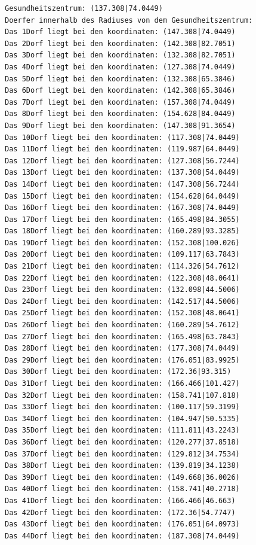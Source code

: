 \documentclass{article}
\begin{document}
\begin{verbatim}
Gesundheitszentrum: (137.308|74.0449)
Doerfer innerhalb des Radiuses von dem Gesundheitszentrum: 
Das 1Dorf liegt bei den koordinaten: (147.308|74.0449)
Das 2Dorf liegt bei den koordinaten: (142.308|82.7051)
Das 3Dorf liegt bei den koordinaten: (132.308|82.7051)
Das 4Dorf liegt bei den koordinaten: (127.308|74.0449)
Das 5Dorf liegt bei den koordinaten: (132.308|65.3846)
Das 6Dorf liegt bei den koordinaten: (142.308|65.3846)
Das 7Dorf liegt bei den koordinaten: (157.308|74.0449)
Das 8Dorf liegt bei den koordinaten: (154.628|84.0449)
Das 9Dorf liegt bei den koordinaten: (147.308|91.3654)
Das 10Dorf liegt bei den koordinaten: (117.308|74.0449)
Das 11Dorf liegt bei den koordinaten: (119.987|64.0449)
Das 12Dorf liegt bei den koordinaten: (127.308|56.7244)
Das 13Dorf liegt bei den koordinaten: (137.308|54.0449)
Das 14Dorf liegt bei den koordinaten: (147.308|56.7244)
Das 15Dorf liegt bei den koordinaten: (154.628|64.0449)
Das 16Dorf liegt bei den koordinaten: (167.308|74.0449)
Das 17Dorf liegt bei den koordinaten: (165.498|84.3055)
Das 18Dorf liegt bei den koordinaten: (160.289|93.3285)
Das 19Dorf liegt bei den koordinaten: (152.308|100.026)
Das 20Dorf liegt bei den koordinaten: (109.117|63.7843)
Das 21Dorf liegt bei den koordinaten: (114.326|54.7612)
Das 22Dorf liegt bei den koordinaten: (122.308|48.0641)
Das 23Dorf liegt bei den koordinaten: (132.098|44.5006)
Das 24Dorf liegt bei den koordinaten: (142.517|44.5006)
Das 25Dorf liegt bei den koordinaten: (152.308|48.0641)
Das 26Dorf liegt bei den koordinaten: (160.289|54.7612)
Das 27Dorf liegt bei den koordinaten: (165.498|63.7843)
Das 28Dorf liegt bei den koordinaten: (177.308|74.0449)
Das 29Dorf liegt bei den koordinaten: (176.051|83.9925)
Das 30Dorf liegt bei den koordinaten: (172.36|93.315)
Das 31Dorf liegt bei den koordinaten: (166.466|101.427)
Das 32Dorf liegt bei den koordinaten: (158.741|107.818)
Das 33Dorf liegt bei den koordinaten: (100.117|59.3199)
Das 34Dorf liegt bei den koordinaten: (104.947|50.5335)
Das 35Dorf liegt bei den koordinaten: (111.811|43.2243)
Das 36Dorf liegt bei den koordinaten: (120.277|37.8518)
Das 37Dorf liegt bei den koordinaten: (129.812|34.7534)
Das 38Dorf liegt bei den koordinaten: (139.819|34.1238)
Das 39Dorf liegt bei den koordinaten: (149.668|36.0026)
Das 40Dorf liegt bei den koordinaten: (158.741|40.2718)
Das 41Dorf liegt bei den koordinaten: (166.466|46.663)
Das 42Dorf liegt bei den koordinaten: (172.36|54.7747)
Das 43Dorf liegt bei den koordinaten: (176.051|64.0973)
Das 44Dorf liegt bei den koordinaten: (187.308|74.0449)

\end{verbatim}
\end{document}
